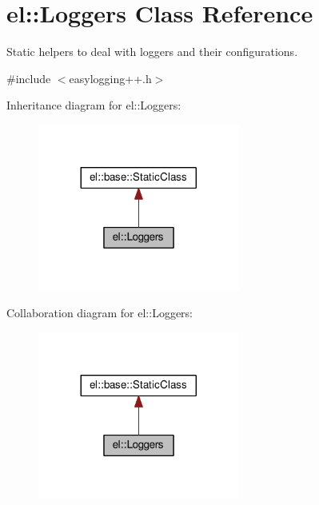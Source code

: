 \hypertarget{classel_1_1_loggers}{}\section{el\+:\+:Loggers Class Reference}
\label{classel_1_1_loggers}


Static helpers to deal with loggers and their configurations.  




{\ttfamily \#include $<$easylogging++.\+h$>$}



Inheritance diagram for el\+:\+:Loggers\+:
\nopagebreak
\begin{figure}[H]
\begin{center}
\leavevmode
\includegraphics[width=188pt]{classel_1_1_loggers__inherit__graph}
\end{center}
\end{figure}


Collaboration diagram for el\+:\+:Loggers\+:
\nopagebreak
\begin{figure}[H]
\begin{center}
\leavevmode
\includegraphics[width=188pt]{classel_1_1_loggers__coll__graph}
\end{center}
\end{figure}
